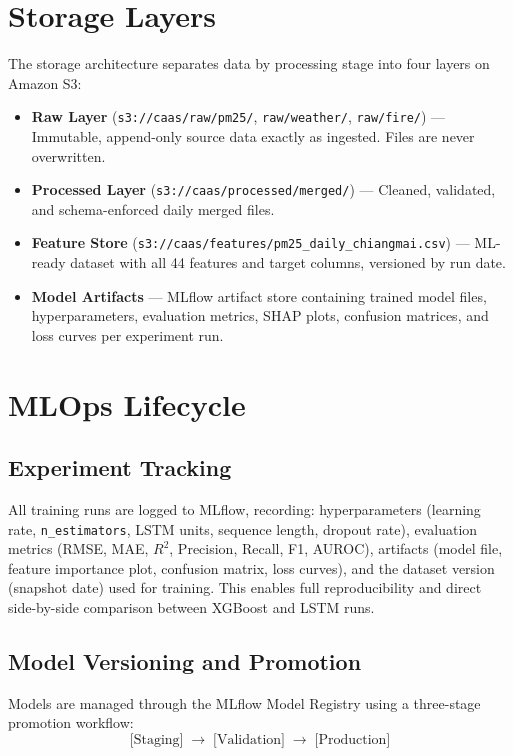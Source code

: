 \documentclass[12pt,a4paper]{report}
\begin{document}
\section{Storage Layers}

The storage architecture separates data by processing stage into four layers on Amazon S3:

\begin{itemize}
  \item \textbf{Raw Layer} (\texttt{s3://caas/raw/pm25/}, \texttt{raw/weather/}, \texttt{raw/fire/}) --- Immutable, append-only source data exactly as ingested. Files are never overwritten.
  \item \textbf{Processed Layer} (\texttt{s3://caas/processed/merged/}) --- Cleaned, validated, and schema-enforced daily merged files.
  \item \textbf{Feature Store} (\texttt{s3://caas/features/pm25\_daily\_chiangmai.csv}) --- ML-ready dataset with all 44 features and target columns, versioned by run date.
  \item \textbf{Model Artifacts} --- MLflow artifact store containing trained model files, hyperparameters, evaluation metrics, SHAP plots, confusion matrices, and loss curves per experiment run.
\end{itemize}

\section{MLOps Lifecycle}

\subsection{Experiment Tracking}

All training runs are logged to MLflow, recording: hyperparameters (learning rate, \texttt{n\_estimators}, LSTM units, sequence length, dropout rate), evaluation metrics (RMSE, MAE, $R^2$, Precision, Recall, F1, AUROC), artifacts (model file, feature importance plot, confusion matrix, loss curves), and the dataset version (snapshot date) used for training. This enables full reproducibility and direct side-by-side comparison between XGBoost and LSTM runs.

\subsection{Model Versioning and Promotion}

Models are managed through the MLflow Model Registry using a three-stage promotion workflow:
\[
\text{[Staging]} \;\longrightarrow\; \text{[Validation]} \;\longrightarrow\; \text{[Production]}
\]
\end{document}
